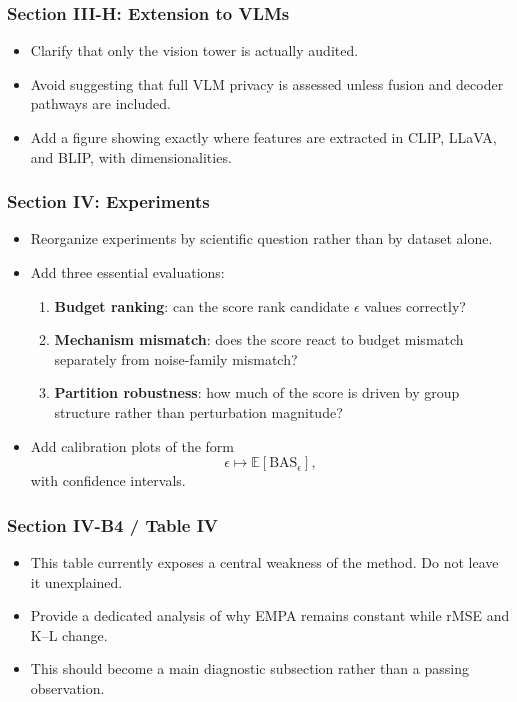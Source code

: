 \subsubsection*{Section III-H: Extension to VLMs}
\begin{itemize}
    \item Clarify that only the vision tower is actually audited.
    \item Avoid suggesting that full VLM privacy is assessed unless fusion and decoder pathways are included.
    \item Add a figure showing exactly where features are extracted in CLIP, LLaVA, and BLIP, with dimensionalities.
\end{itemize}

\subsubsection*{Section IV: Experiments}
\begin{itemize}
    \item Reorganize experiments by scientific question rather than by dataset alone.
    \item Add three essential evaluations:
    \begin{enumerate}
        \item \textbf{Budget ranking}: can the score rank candidate $\epsilon$ values correctly?
        \item \textbf{Mechanism mismatch}: does the score react to budget mismatch separately from noise-family mismatch?
        \item \textbf{Partition robustness}: how much of the score is driven by group structure rather than perturbation magnitude?
    \end{enumerate}
    \item Add calibration plots of the form
    \begin{equation}
    \epsilon \mapsto \mathbb{E}[\mathrm{BAS}_{\epsilon}],
    \end{equation}
    with confidence intervals.
\end{itemize}

\subsubsection*{Section IV-B4 / Table IV}
\begin{itemize}
    \item This table currently exposes a central weakness of the method. Do not leave it unexplained.
    \item Provide a dedicated analysis of why EMPA remains constant while rMSE and K--L change.
    \item This should become a main diagnostic subsection rather than a passing observation.
\end{itemize}

